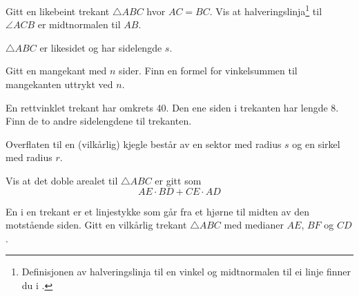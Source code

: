 Gitt en likebeint trekant $\triangle {ABC} $ hvor $ AC=BC $. Vis at halveringslinja\footnote{Definisjonen av halveringslinja til en vinkel og midtnormalen til ei linje finner du i \tmen.} til $ \angle ACB $ er midtnormalen til $ AB $.

$ \triangle ABC $ er likesidet og har sidelengde $ s $. 

\newpage
{}

Gitt en mangekant med $ n $ sider. Finn en formel for vinkelsummen til mangekanten uttrykt ved $ n $.


En rettvinklet trekant har omkrets 40. Den ene siden i trekanten har lengde 8. Finn de to andre sidelengdene til trekanten.

\newpage
{}
Overflaten til en (vilkårlig) kjegle består av en sektor med radius $ s $ og en sirkel med radius $ r $.




Vis at det doble arealet til $ \triangle ABC $ er gitt som
\[ AE\cdot BD + CE\cdot AD \]


En  i en trekant er et linjestykke som går fra et hjørne til midten av den motstående siden. 
Gitt en vilkårlig trekant $ \triangle ABC $ med medianer $ AE $, $ BF $ og  $ CD $. 


